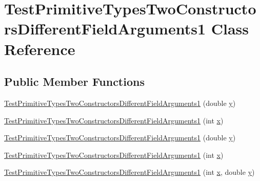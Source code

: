 \hypertarget{classTestPrimitiveTypesTwoConstructorsDifferentFieldArguments1}{
\section{TestPrimitiveTypesTwoConstructorsDifferentFieldArguments1 Class Reference}
\label{classTestPrimitiveTypesTwoConstructorsDifferentFieldArguments1}
}
\subsection*{Public Member Functions}
\begin{DoxyCompactItemize}
\item 
\hyperlink{classTestPrimitiveTypesTwoConstructorsDifferentFieldArguments1_aa00891e2962ccc8279b24e823fcdd32d}{TestPrimitiveTypesTwoConstructorsDifferentFieldArguments1} (double \hyperlink{classTestPrimitiveTypesTwoConstructorsDifferentFieldArguments1_ab64a7a788b063deede64506ebab62066}{y})
\item 
\hyperlink{classTestPrimitiveTypesTwoConstructorsDifferentFieldArguments1_a6057156167fd1ba155e99b220de5f55a}{TestPrimitiveTypesTwoConstructorsDifferentFieldArguments1} (int \hyperlink{classTestPrimitiveTypesTwoConstructorsDifferentFieldArguments1_a6a852ce8aec44e85089a0b28b8f5e011}{x})
\item 
\hyperlink{classTestPrimitiveTypesTwoConstructorsDifferentFieldArguments1_aa00891e2962ccc8279b24e823fcdd32d}{TestPrimitiveTypesTwoConstructorsDifferentFieldArguments1} (double \hyperlink{classTestPrimitiveTypesTwoConstructorsDifferentFieldArguments1_ab64a7a788b063deede64506ebab62066}{y})
\item 
\hyperlink{classTestPrimitiveTypesTwoConstructorsDifferentFieldArguments1_a6057156167fd1ba155e99b220de5f55a}{TestPrimitiveTypesTwoConstructorsDifferentFieldArguments1} (int \hyperlink{classTestPrimitiveTypesTwoConstructorsDifferentFieldArguments1_a6a852ce8aec44e85089a0b28b8f5e011}{x})
\item 
\hyperlink{classTestPrimitiveTypesTwoConstructorsDifferentFieldArguments1_ac93c61903028e83b8b5133df80ae9548}{TestPrimitiveTypesTwoConstructorsDifferentFieldArguments1} (int \hyperlink{classTestPrimitiveTypesTwoConstructorsDifferentFieldArguments1_a6a852ce8aec44e85089a0b28b8f5e011}{x}, double \hyperlink{classTestPrimitiveTypesTwoConstructorsDifferentFieldArguments1_ab64a7a788b063deede64506ebab62066}{y})
\end{DoxyCompactItemize}
